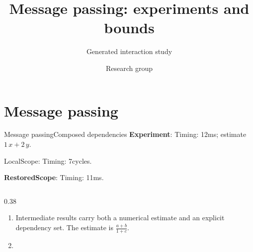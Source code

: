 \documentclass[12pt,aspectratio=43]{beamer}
\title{Message passing: experiments and bounds}
\subtitle{Generated interaction study}
\author{Research group}
\date{}
\newcommand{\fuzzlayerA}[1]{\textbf{#1}}
\newcommand{\fuzzterm}[1]{\fuzzlayerA{#1}}
\newcommand{\fuzzpair}[2]{\fuzzterm{#1}: #2}
\newcommand{\fuzzunit}{ms}
\newcommand{\fuzzcoefficient}{1}
\newcommand{\fuzzscale}[2][\fuzzcoefficient]{#1\,#2}
\begin{document}
\section{Message passing}
\begin{frame}[t,shrink=5]{Message passing}{Composed dependencies}
\fuzzpair{Experiment}{Timing: 12\fuzzunit; estimate $\fuzzscale{x}+\fuzzscale[2]{y}$.}\par
{\renewcommand{\fuzzunit}{cycles}\let\fuzzterm\textrm\fuzzpair{LocalScope}{Timing: 7\fuzzunit.}\par}
\fuzzpair{RestoredScope}{Timing: 11\fuzzunit.}\par
\begin{columns}[onlytextwidth,b]
\begin{column}{0.38\textwidth}
\begin{enumerate}
\item<1-> {\scriptsize\color{black}\centering
\textrm{Intermediate results carry} both a numerical estimate and an explicit dependency set.  The estimate is $\frac{a+b}{1+c}$.\par}
\item<2-> 
\end{enumerate}
\end{column}
\end{columns}
\end{frame}
\end{document}
